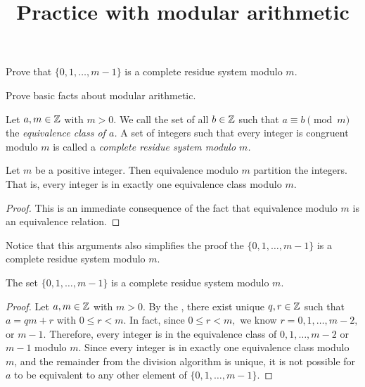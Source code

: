 \documentclass{ximera}
\title{Practice with modular arithmetic}
\begin{document}
\begin{abstract}
\end{abstract}
\maketitle


\begin{obj}
 \item Prove that $\{0,1,\dots,m-1\}$ is a complete residue system modulo $m$.
 \item Prove basic facts about modular arithmetic.
\end{obj}


\begin{defn}\label{defn:complete-residue}
    Let $a,m\in\mathbb Z$ with $m>0$. We call the set of all $b\in\mathbb Z$ such that $a\equiv b \pmod{m}$ the \emph{equivalence class of $a$.} A set of integers such that every integer is congruent modulo $m$ is called a \emph{complete residue system modulo $m$.}
\end{defn}

\begin{proposition}\label{cor:mod-partition}
    Let $m$ be a positive integer. Then equivalence modulo $m$ partition the integers. That is, every integer is in exactly one equivalence class modulo $m$.

    \begin{proof}
        This is an immediate consequence of the fact that equivalence modulo $m$ is an equivalence relation.
    \end{proof}
\end{proposition}
 
Notice that this arguments also simplifies the proof the $\{0,1,\dots,m-1\}$ is a complete residue system modulo $m$.
\begin{proposition}\label{prop:complete-residue}
    The set $\{0,1,\dots,m-1\}$ is a complete residue system modulo $m$.

    \begin{proof}
        Let $a,m\in\mathbb Z$ with $m>0$. By the , there exist unique $q,r\in\mathbb Z$ such that $a=qm+r$ with $0\leq r <m$. In fact, since $0\leq r<m,$ we know $r=0,1,\dots, m-2,$ or $m-1$. Therefore, every integer is in the equivalence class of $0,1,\dots, m-2$ or $m-1$ modulo $m$.
        Since every integer is in exactly one equivalence class modulo $m$, and the remainder from the division algorithm is unique, it is not possible for $a$ to be equivalent to any other element of $\{0,1,\dots,m-1\}$. 
    \end{proof}
\end{proposition}
\end{document}

